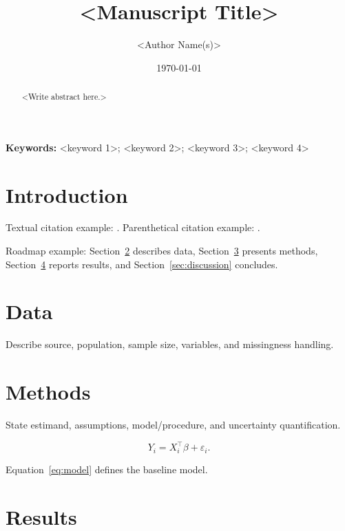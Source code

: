 \documentclass[12pt]{article}
\title{<Manuscript Title>}
\author{<Author Name(s)>}
\date{\today}
\begin{document}
\maketitle

\begin{abstract}
<Write abstract here.>
\end{abstract}

\noindent\textbf{Keywords:} <keyword 1>; <keyword 2>; <keyword 3>; <keyword 4>

\doublespacing

\section{Introduction}\label{sec:introduction}


Textual citation example: \citet{smith2020example}.
Parenthetical citation example: \citep{smith2020example}.

Roadmap example: Section~\ref{sec:data} describes data,
Section~\ref{sec:methods} presents methods,
Section~\ref{sec:results} reports results, and
Section~\ref{sec:discussion} concludes.

\section{Data}\label{sec:data}

Describe source, population, sample size, variables, and missingness handling.

\section{Methods}\label{sec:methods}

State estimand, assumptions, model/procedure, and uncertainty quantification.

\begin{equation}\label{eq:model}
Y_i = X_i^\top \beta + \varepsilon_i.
\end{equation}

Equation~\eqref{eq:model} defines the baseline model.

\section{Results}\label{sec:results}
\end{document}
